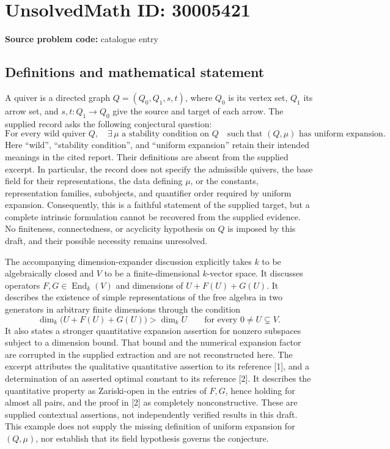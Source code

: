 \documentclass[11pt]{article}
\begin{document}
\section*{UnsolvedMath ID: 30005421}
\textbf{Source problem code:} catalogue entry
\subsection{Definitions and mathematical statement}
A quiver is a directed graph \(Q=(Q_0,Q_1,s,t)\), where \(Q_0\) is its vertex set, \(Q_1\) its arrow set, and \(s,t:Q_1\to Q_0\) give the source and target of each arrow. The supplied record asks the following conjectural question:
\[
\text{For every wild quiver }Q,\quad
\exists\,\mu\text{ a stability condition on }Q
\quad\text{such that }(Q,\mu)\text{ has uniform expansion.}
\]
Here ``wild'', ``stability condition'', and ``uniform expansion'' retain their intended meanings in the cited report. Their definitions are absent from the supplied excerpt. In particular, the record does not specify the admissible quivers, the base field for their representations, the data defining \(\mu\), or the constants, representation families, subobjects, and quantifier order required by uniform expansion. Consequently, this is a faithful statement of the supplied target, but a complete intrinsic formulation cannot be recovered from the supplied evidence. No finiteness, connectedness, or acyclicity hypothesis on \(Q\) is imposed by this draft, and their possible necessity remains unresolved.

The accompanying dimension-expander discussion explicitly takes \(k\) to be algebraically closed and \(V\) to be a finite-dimensional \(k\)-vector space. It discusses operators \(F,G\in\operatorname{End}_k(V)\) and dimensions of \(U+F(U)+G(U)\). It describes the existence of simple representations of the free algebra in two generators in arbitrary finite dimensions through the condition
\[
\dim_k\bigl(U+F(U)+G(U)\bigr)>\dim_k U
\qquad\text{for every }0\ne U\subsetneq V.
\]
It also states a stronger quantitative expansion assertion for nonzero subspaces subject to a dimension bound. That bound and the numerical expansion factor are corrupted in the supplied extraction and are not reconstructed here. The excerpt attributes the qualitative quantitative assertion to its reference [1], and a determination of an asserted optimal constant to its reference [2]. It describes the quantitative property as Zariski-open in the entries of \(F,G\), hence holding for almost all pairs, and the proof in [2] as completely nonconstructive. These are supplied contextual assertions, not independently verified results in this draft. This example does not supply the missing definition of uniform expansion for \((Q,\mu)\), nor establish that its field hypothesis governs the conjecture.
\end{document}
